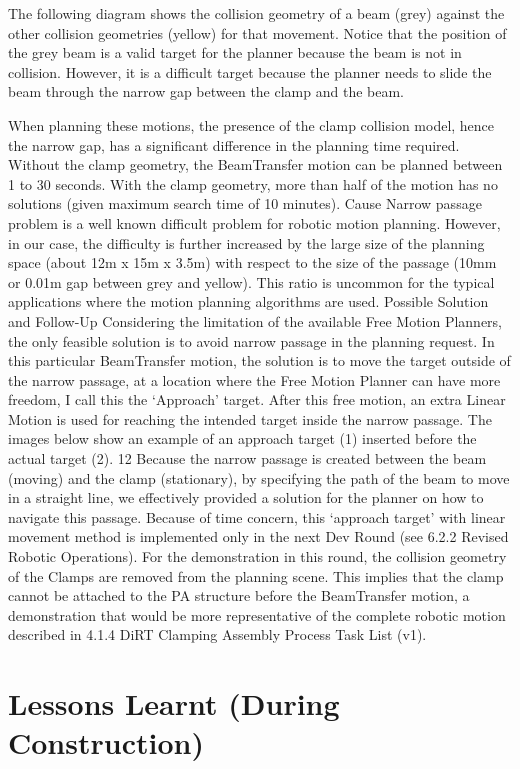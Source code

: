 \begin{itemize}
\begin{enumerate}
The following diagram shows the collision geometry of a beam (grey) against the other collision geometries (yellow) for that movement. Notice that the position of the grey beam is a valid target for the planner because the beam is not in collision. However, it is a difficult target because the planner needs to slide the beam through the narrow gap between the clamp and the beam. 

When planning these motions, the presence of the clamp collision model, hence the narrow gap, has a significant difference in the planning time required. Without the clamp geometry, the BeamTransfer motion can be planned between 1 to 30 seconds. With the clamp geometry, more than half of the motion has no solutions (given maximum search time of 10 minutes).
Cause
Narrow passage problem is a well known difficult problem for robotic motion planning. However, in our case, the difficulty is further increased by the large size of the planning space (about 12m x 15m x 3.5m) with respect to the size of the passage (10mm or 0.01m gap between grey and yellow). This ratio is uncommon for the typical applications where the motion planning algorithms are used.
Possible Solution and Follow-Up
Considering the limitation of the available Free Motion Planners, the only feasible solution is to avoid narrow passage in the planning request. In this particular BeamTransfer motion, the solution is to move the target outside of the narrow passage, at a location where the Free Motion Planner can have more freedom, I call this the ‘Approach’ target. After this free motion, an extra Linear Motion is used for reaching the intended target inside the narrow passage. The images below show an example of an approach target (1) inserted before the actual target (2).
12
Because the narrow passage is created between the beam (moving) and the clamp (stationary), by specifying the path of the beam to move in a straight line, we effectively provided a solution for the planner on how to navigate this passage. 
Because of time concern, this ‘approach target’ with linear movement method is implemented only in the next Dev Round (see 6.2.2 Revised Robotic Operations). For the demonstration in this round, the collision geometry of the Clamps are removed from the planning scene. This implies that the clamp cannot be attached to the PA structure before the BeamTransfer motion, a demonstration that would be more representative of the complete robotic motion described in 4.1.4 DiRT Clamping Assembly Process Task List (v1).

\section{Lessons Learnt (During Construction)}

\end{enumerate}
\end{itemize}
